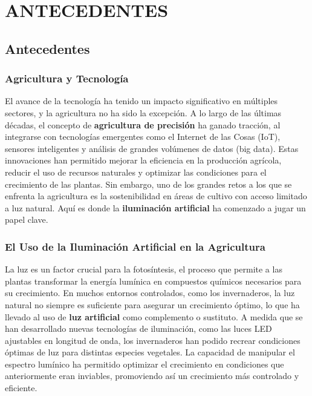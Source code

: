 \chapter{ANTECEDENTES}

\section{Antecedentes}

\subsection{Agricultura y Tecnología}
El avance de la tecnología ha tenido un impacto significativo en múltiples sectores, y la agricultura no ha sido la excepción. A lo largo de las últimas décadas, el concepto de \textbf{agricultura de precisión} ha ganado tracción, al integrarse con tecnologías emergentes como el Internet de las Cosas (IoT), sensores inteligentes y análisis de grandes volúmenes de datos (big data). Estas innovaciones han permitido mejorar la eficiencia en la producción agrícola, reducir el uso de recursos naturales y optimizar las condiciones para el crecimiento de las plantas. Sin embargo, uno de los grandes retos a los que se enfrenta la agricultura es la sostenibilidad en áreas de cultivo con acceso limitado a luz natural. Aquí es donde la \textbf{iluminación artificial} ha comenzado a jugar un papel clave.

\subsection{El Uso de la Iluminación Artificial en la Agricultura}
La luz es un factor crucial para la fotosíntesis, el proceso que permite a las plantas transformar la energía lumínica en compuestos químicos necesarios para su crecimiento. En muchos entornos controlados, como los invernaderos, la luz natural no siempre es suficiente para asegurar un crecimiento óptimo, lo que ha llevado al uso de \textbf{luz artificial} como complemento o sustituto. A medida que se han desarrollado nuevas tecnologías de iluminación, como las luces LED ajustables en longitud de onda, los invernaderos han podido recrear condiciones óptimas de luz para distintas especies vegetales. La capacidad de manipular el espectro lumínico ha permitido optimizar el crecimiento en condiciones que anteriormente eran inviables, promoviendo así un crecimiento más controlado y eficiente.


